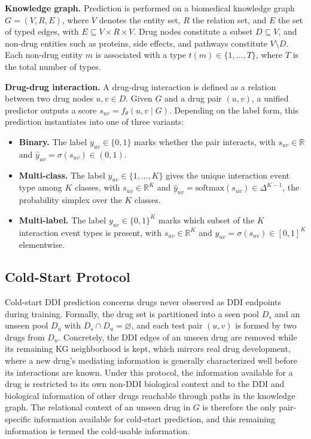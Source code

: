 \documentclass[letterpaper]{article} %
\begin{document}
\textbf{Knowledge graph.} 
Prediction is performed on a biomedical knowledge graph $G=(V,R,E)$, where $V$ denotes the entity set, $R$ the relation set, and $E$ the set of typed edges, with $E\subseteq V\times R\times V$. 
%
Drug nodes constitute a subset $D\subseteq V$, and non-drug entities such as proteins, side effects, and pathways constitute $V\setminus D$. 
%
Each non-drug entity $m$ is associated with a type $t(m)\in\{1,\dots,T\}$, where $T$ is the total number of types.

\noindent \textbf{Drug-drug interaction.} 
A drug-drug interaction is defined as a relation between two drug nodes $u,v\in D$. 
%
Given $G$ and a drug pair $(u,v)$, a unified predictor outputs a score $s_{uv}=f_\theta(u,v\mid G)$. Depending on the label form, this prediction instantiates into one of three variants:

\begin{itemize}
  \item \textbf{Binary.} The label $y_{uv}\in\{0,1\}$ marks whether the pair interacts, with $s_{uv}\in\mathbb{R}$ and $\hat{y}_{uv}=\sigma(s_{uv})\in(0,1)$.
  \item \textbf{Multi-class.} The label $y_{uv}\in\{1,\dots,K\}$ gives the unique interaction event type among $K$ classes, with $s_{uv}\in\mathbb{R}^{K}$ and $\hat{y}_{uv}=\mathrm{softmax}(s_{uv})\in\Delta^{K-1}$, the probability simplex over the $K$ classes.
  \item \textbf{Multi-label.} The label $y_{uv}\in\{0,1\}^{K}$ marks which subset of the $K$ interaction event types is present, with $s_{uv}\in\mathbb{R}^{K}$ and $\hat{y}_{uv}=\sigma(s_{uv})\in[0,1]^{K}$ elementwise.
\end{itemize}

\subsection{Cold-Start Protocol}

Cold-start DDI prediction concerns drugs never observed as DDI endpoints during training. Formally, the drug set is partitioned into a seen pool $D_s$ and an unseen pool $D_u$ with $D_s\cap D_u=\varnothing$, and each test pair $(u,v)$ is formed by two drugs from $D_u$. 
%  
Concretely, the DDI edges of an unseen drug are removed while its remaining KG neighborhood is kept, which mirrors real drug development, where a new drug's mediating information is generally characterized well before its interactions are known.
%
Under this protocol, the information available for a drug is restricted to its own non-DDI biological context and to the DDI and biological information of other drugs reachable through paths in the knowledge graph. 
%
The relational context of an unseen drug in $G$ is therefore the only pair-specific information available for cold-start prediction, and this remaining information is termed the cold-usable information.
\end{document}
